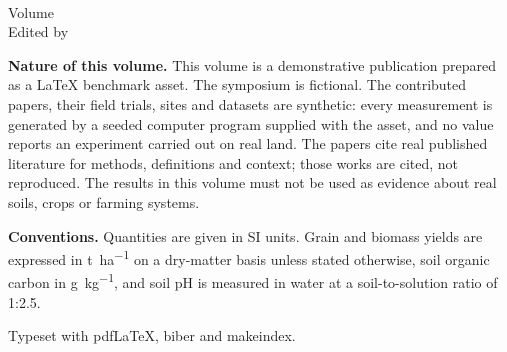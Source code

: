 \thispagestyle{empty}
\vspace*{\fill}
\noindent\textbf{\volumetitle}\\
Volume \volumenumber\\
Edited by \volumeeditor

\bigskip
\noindent\textbf{Nature of this volume.} This volume is a demonstrative
publication prepared as a LaTeX benchmark asset. The symposium is fictional.
The contributed papers, their field trials, sites and datasets are synthetic:
every measurement is generated by a seeded computer program supplied with the
asset, and no value reports an experiment carried out on real land. The papers
cite real published literature for methods, definitions and context; those
works are cited, not reproduced. The results in this volume must not be used
as evidence about real soils, crops or farming systems.

\bigskip
\noindent\textbf{Conventions.} Quantities are given in SI units. Grain and
biomass yields are expressed in \si{\tonne\per\hectare} on a dry-matter basis
unless stated otherwise, soil organic carbon in \si{\gram\per\kilo\gram}, and
soil pH is measured in water at a soil-to-solution ratio of 1:2.5.

\bigskip
\noindent Typeset with pdf\LaTeX, biber and makeindex.
\vspace*{\fill}
\cleardoublepage
